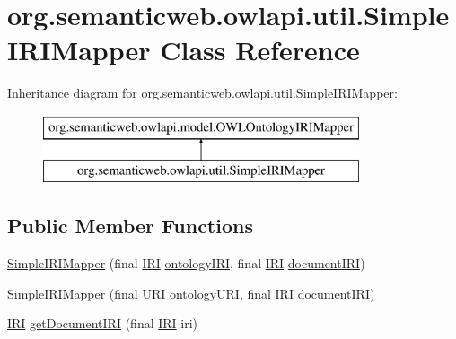 \hypertarget{classorg_1_1semanticweb_1_1owlapi_1_1util_1_1_simple_i_r_i_mapper}{\section{org.\-semanticweb.\-owlapi.\-util.\-Simple\-I\-R\-I\-Mapper Class Reference}
\label{classorg_1_1semanticweb_1_1owlapi_1_1util_1_1_simple_i_r_i_mapper}
}
Inheritance diagram for org.\-semanticweb.\-owlapi.\-util.\-Simple\-I\-R\-I\-Mapper\-:\begin{figure}[H]
\begin{center}
\leavevmode
\includegraphics[height=2.000000cm]{classorg_1_1semanticweb_1_1owlapi_1_1util_1_1_simple_i_r_i_mapper}
\end{center}
\end{figure}
\subsection*{Public Member Functions}
\begin{DoxyCompactItemize}
\item 
\hyperlink{classorg_1_1semanticweb_1_1owlapi_1_1util_1_1_simple_i_r_i_mapper_a93b4eae6806cabad0f68fd0260ab4e4c}{Simple\-I\-R\-I\-Mapper} (final \hyperlink{classorg_1_1semanticweb_1_1owlapi_1_1model_1_1_i_r_i}{I\-R\-I} \hyperlink{classorg_1_1semanticweb_1_1owlapi_1_1util_1_1_simple_i_r_i_mapper_acd9fe8b7322f4627f0d418fcc124404c}{ontology\-I\-R\-I}, final \hyperlink{classorg_1_1semanticweb_1_1owlapi_1_1model_1_1_i_r_i}{I\-R\-I} \hyperlink{classorg_1_1semanticweb_1_1owlapi_1_1util_1_1_simple_i_r_i_mapper_af7e969ae573d1d704e849d65d5096dae}{document\-I\-R\-I})
\item 
\hyperlink{classorg_1_1semanticweb_1_1owlapi_1_1util_1_1_simple_i_r_i_mapper_a6d96d19c16cb5f1541e3342821a69653}{Simple\-I\-R\-I\-Mapper} (final U\-R\-I ontology\-U\-R\-I, final \hyperlink{classorg_1_1semanticweb_1_1owlapi_1_1model_1_1_i_r_i}{I\-R\-I} \hyperlink{classorg_1_1semanticweb_1_1owlapi_1_1util_1_1_simple_i_r_i_mapper_af7e969ae573d1d704e849d65d5096dae}{document\-I\-R\-I})
\item 
\hyperlink{classorg_1_1semanticweb_1_1owlapi_1_1model_1_1_i_r_i}{I\-R\-I} \hyperlink{classorg_1_1semanticweb_1_1owlapi_1_1util_1_1_simple_i_r_i_mapper_a563e2a99f1f4ee3e0517189a420f9c8b}{get\-Document\-I\-R\-I} (final \hyperlink{classorg_1_1semanticweb_1_1owlapi_1_1model_1_1_i_r_i}{I\-R\-I} iri)
\end{DoxyCompactItemize}
